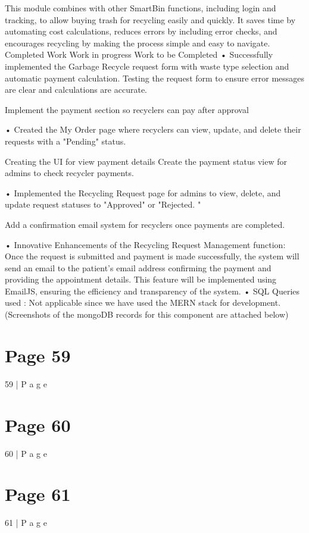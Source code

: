 \documentclass{article}
\begin{document}
This module combines with other SmartBin functions, including login and tracking, to allow 
buying trash for recycling easily and quickly. It saves time by automating cost calculations, 
reduces errors by including error checks, and encourages recycling by making the process 
simple and easy to navigate. 
Completed Work Work in progress Work to be Completed 
• Successfully 
implemented the 
Garbage Recycle 
request form with 
waste type selection 
and automatic 
payment 
calculation. 
Testing the request form to 
ensure error messages are 
clear and calculations are 
accurate. 
 
Implement the payment 
section so recyclers can 
pay after approval 
 
• Created the My 
Order page where 
recyclers can view, 
update, and delete 
their requests with a 
"Pending" status. 
 
Creating the UI for view 
payment details 
Create the payment status 
view for admins to check 
recycler payments. 
 
• Implemented the 
Recycling Request 
page for admins to 
view, delete, and 
update request 
statuses to 
"Approved" or 
"Rejected. " 
 
 Add a confirmation email 
system for recyclers once 
payments are completed. 
 
 
• Innovative Enhancements of the Recycling Request Management function: 
Once the request is submitted and payment is made successfully, the system will send an 
email to the patient's email address confirming the payment and providing the 
appointment details. This feature will be implemented using EmailJS, ensuring the 
efficiency and transparency of the system. 
• SQL Queries used : Not applicable since we have used the MERN stack for development.  
(Screenshots of the mongoDB records for this component are attached below) 
 

\section*{Page 59}
59 | P a g e 
 
 
 
 

\section*{Page 60}
60 | P a g e 
 
 
 


\section*{Page 61}
61 | P a g e 
 
\end{document}
